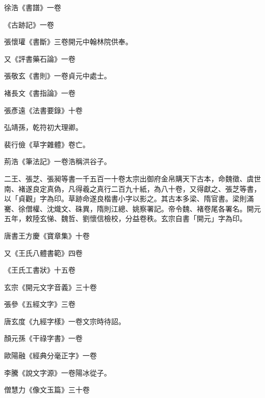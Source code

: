 \begin{pinyinscope}
 徐浩《書譜》一卷



 《古跡記》一卷



 張懷瓘《書斷》三卷開元中翰林院供奉。



 又《評書藥石論》一卷



 張敬玄《書則》一卷貞元中處士。



 褚長文《書指論》一卷



 張彥遠《法書要錄》十卷



 弘靖孫，乾符初大理卿。



 裴行儉《草字雜體》卷亡。



 荊浩《筆法記》一卷浩稱洪谷子。



 二王、張芝、張昶等書一千五百一十卷太宗出御府金帛購天下古本，命魏徵、虞世南、褚遂良定真偽，凡得羲之真行二百九十紙，為八十卷，又得獻之、張芝等書，以「貞觀」字為印。草跡命遂良楷書小字以影之。其古本多梁、隋官書。梁則滿騫、徐僧權、沈熾文、硃異，隋則江總、姚察署記。帝令魏、褚卷尾各署名。開元五年，敕陸玄悌、魏哲、劉懷信檢校，分益卷秩。玄宗自書「開元」字為印。



 唐書王方慶《寶章集》十卷



 又《王氏八體書範》四卷



 《王氏工書狀》十五卷



 玄宗《開元文字音義》三十卷



 張參《五經文字》三卷



 唐玄度《九經字樣》一卷文宗時待詔。



 顏元孫《干祿字書》一卷



 歐陽融《經典分毫正字》一卷



 李騰《說文字源》一卷陽冰從子。



 僧慧力《像文玉篇》三十卷




\end{pinyinscope}
